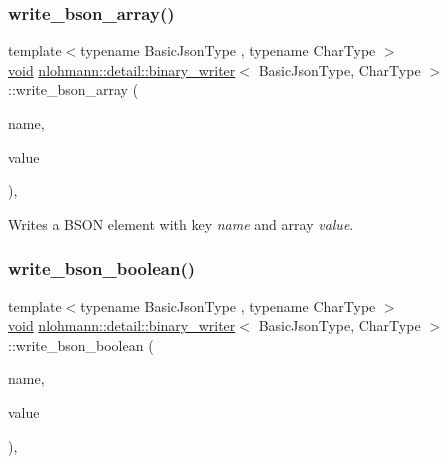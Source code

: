 \subsubsection{\texorpdfstring{write\+\_\+bson\+\_\+array()}{write\_bson\_array()}}
{\footnotesize\ttfamily template$<$typename Basic\+Json\+Type , typename Char\+Type $>$ \\
\hyperlink{namespacenlohmann_1_1detail_a59fca69799f6b9e366710cb9043aa77d}{void} \hyperlink{classnlohmann_1_1detail_1_1binary__writer}{nlohmann\+::detail\+::binary\+\_\+writer}$<$ Basic\+Json\+Type, Char\+Type $>$\+::write\+\_\+bson\+\_\+array (\begin{DoxyParamCaption}\item[{const \hyperlink{classnlohmann_1_1detail_1_1binary__writer_a29f2ae7a5c4a8c1dae47b3b2310de8a8}{string\+\_\+t} \&}]{name,  }\item[{const typename Basic\+Json\+Type\+::array\+\_\+t \&}]{value }\end{DoxyParamCaption})\hspace{0.3cm}{\ttfamily [inline]}, {\ttfamily [private]}}



Writes a B\+S\+ON element with key {\itshape name} and array {\itshape value}. 

\mbox{\label{classnlohmann_1_1detail_1_1binary__writer_ae099435e1df3096e0fc78333282f8f67}} 
\subsubsection{\texorpdfstring{write\+\_\+bson\+\_\+boolean()}{write\_bson\_boolean()}}
{\footnotesize\ttfamily template$<$typename Basic\+Json\+Type , typename Char\+Type $>$ \\
\hyperlink{namespacenlohmann_1_1detail_a59fca69799f6b9e366710cb9043aa77d}{void} \hyperlink{classnlohmann_1_1detail_1_1binary__writer}{nlohmann\+::detail\+::binary\+\_\+writer}$<$ Basic\+Json\+Type, Char\+Type $>$\+::write\+\_\+bson\+\_\+boolean (\begin{DoxyParamCaption}\item[{const \hyperlink{classnlohmann_1_1detail_1_1binary__writer_a29f2ae7a5c4a8c1dae47b3b2310de8a8}{string\+\_\+t} \&}]{name,  }\item[{const bool}]{value }\end{DoxyParamCaption})\hspace{0.3cm}{\ttfamily [inline]}, {\ttfamily [private]}}




